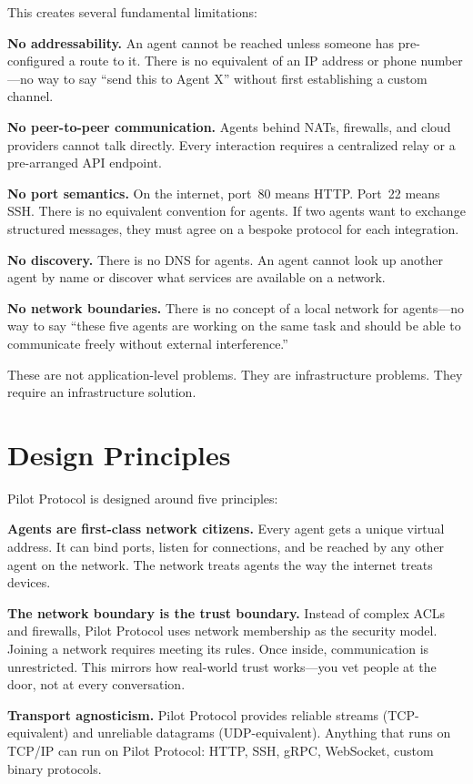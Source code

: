 \documentclass[11pt,a4paper]{article}
\begin{document}
This creates several fundamental limitations:

\textbf{No addressability.} An agent cannot be reached unless someone has pre-configured a route to it. There is no equivalent of an IP address or phone number---no way to say ``send this to Agent X'' without first establishing a custom channel.

\textbf{No peer-to-peer communication.} Agents behind NATs, firewalls, and cloud providers cannot talk directly. Every interaction requires a centralized relay or a pre-arranged API endpoint.

\textbf{No port semantics.} On the internet, port~80 means HTTP. Port~22 means SSH. There is no equivalent convention for agents. If two agents want to exchange structured messages, they must agree on a bespoke protocol for each integration.

\textbf{No discovery.} There is no DNS for agents. An agent cannot look up another agent by name or discover what services are available on a network.

\textbf{No network boundaries.} There is no concept of a local network for agents---no way to say ``these five agents are working on the same task and should be able to communicate freely without external interference.''

These are not application-level problems. They are infrastructure problems. They require an infrastructure solution.

\section{Design Principles}

Pilot Protocol is designed around five principles:

\textbf{Agents are first-class network citizens.} Every agent gets a unique virtual address. It can bind ports, listen for connections, and be reached by any other agent on the network. The network treats agents the way the internet treats devices.

\textbf{The network boundary is the trust boundary.} Instead of complex ACLs and firewalls, Pilot Protocol uses network membership as the security model. Joining a network requires meeting its rules. Once inside, communication is unrestricted. This mirrors how real-world trust works---you vet people at the door, not at every conversation.

\textbf{Transport agnosticism.} Pilot Protocol provides reliable streams (TCP-equivalent) and unreliable datagrams (UDP-equivalent). Anything that runs on TCP/IP can run on Pilot Protocol: HTTP, SSH, gRPC, WebSocket, custom binary protocols.
\end{document}

